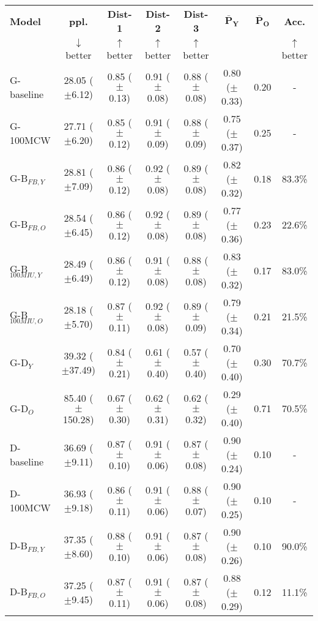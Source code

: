 \begin{table*}[h]
    \centering
    \begin{tabular}{l | c c c c | c c c}
    \toprule
    \textbf{Model} & \textbf{ppl.} & \textbf{Dist-1} & \textbf{Dist-2} & \textbf{Dist-3} & $\boldsymbol{\bar{P}_Y}$ & $\boldsymbol{\bar{P}_O}$ & \textbf{Acc.}\\
     & $\downarrow$ better & $\uparrow$ better & $\uparrow$ better & $\uparrow$ better & & & $\uparrow$ better\\
    \midrule
    \midrule
    G-baseline & 28.05 ($\pm$6.12) & 0.85 ($\pm$0.13) & 0.91 ($\pm$0.08) & 0.88 ($\pm$0.08) & 0.80 ($\pm$0.33) & 0.20 & -\\
    G-100MCW & 27.71 ($\pm$6.20) & 0.85 ($\pm$0.12) & 0.91 ($\pm$0.09) & 0.88 ($\pm$0.09) & 0.75 ($\pm$0.37) & 0.25 & -\\
    \midrule
    G-B$_{FB, Y}$ & 28.81 ($\pm$7.09) & 0.86 ($\pm$0.12) & 0.92 ($\pm$0.08) & 0.89 ($\pm$0.08) & 0.82 ($\pm$0.32) & 0.18 & 83.3\%\\
    G-B$_{FB, O}$ & 28.54 ($\pm$6.45) & 0.86 ($\pm$0.12) & 0.92 ($\pm$0.08) & 0.89 ($\pm$0.08) & 0.77 ($\pm$0.36) & 0.23 & 22.6\%\\
    G-B$_{100MIU, Y}$ & 28.49 ($\pm$6.49) & 0.86 ($\pm$0.12) & 0.91 ($\pm$0.08) & 0.88 ($\pm$0.08) & 0.83 ($\pm$0.32) & 0.17 & 83.0\%\\
    G-B$_{100MIU, O}$ & 28.18 ($\pm$5.70) & 0.87 ($\pm$0.11) & 0.92 ($\pm$0.08) & 0.89 ($\pm$0.09) & 0.79 ($\pm$0.34) & 0.21 & 21.5\%\\
    \midrule
    G-D$_{Y}$ & 39.32 ($\pm$37.49) & 0.84 ($\pm$0.21) & 0.61 ($\pm$0.40) & 0.57 ($\pm$0.40) & 0.70 ($\pm$0.40) & 0.30 & 70.7\%\\
    G-D$_{O}$ & 85.40 ($\pm$150.28) & 0.67 ($\pm$0.30) & 0.62 ($\pm$0.31) & 0.62 ($\pm$0.32) & 0.29 ($\pm$0.40) & 0.71 & 70.5\%\\
    \midrule
    \midrule
    D-baseline & 36.69 ($\pm$9.11) & 0.87 ($\pm$0.10) & 0.91 ($\pm$0.06) & 0.87 ($\pm$0.08) & 0.90 ($\pm$0.24) & 0.10 & -\\
    D-100MCW & 36.93 ($\pm$9.18) & 0.86 ($\pm$0.11) & 0.91 ($\pm$0.06) & 0.88 ($\pm$0.07) & 0.90 ($\pm$0.25) & 0.10 & -\\
    \midrule
    D-B$_{FB, Y}$ & 37.35 ($\pm$8.60) & 0.88 ($\pm$0.10) & 0.91 ($\pm$0.06) & 0.87 ($\pm$0.08) & 0.90 ($\pm$0.26) & 0.10 & 90.0\%\\
    D-B$_{FB, O}$ & 37.25 ($\pm$9.45) & 0.87 ($\pm$0.11) & 0.91 ($\pm$0.06) & 0.87 ($\pm$0.08) & 0.88 ($\pm$0.29) & 0.12 & 11.1\%\\

\end{tabular}
\end{table*}

